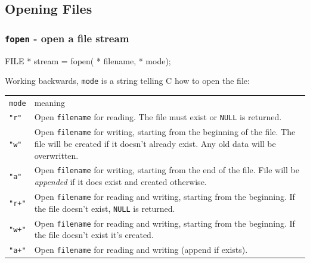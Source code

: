 \documentclass[smaller,handout,table]{beamer}
\begin{document}
\subsection{Opening Files}
\begin{frame}
\frametitle{{\tt fopen} - open a file stream}
\begin{semiverbatim}
\small
FILE * stream = fopen( * filename,  * mode);
\end{semiverbatim}

Working backwards, {\tt mode} is a string telling C how to open the file:
{\footnotesize
\begin{center}
\begin{tabular}{l p{250pt}}
\tt mode& meaning\\
\tt "r"& Open {\tt filename} for reading. The file must exist or {\tt NULL} is returned.\\
\tt "w"& Open {\tt filename} for writing, starting from the beginning of the file. The file will be created if it doesn't already exist. Any old data will be overwritten.\\
\tt "a"& Open {\tt filename} for writing, starting from the end of the file. File will be \emph{appended} if it does exist and created otherwise.\\
\tt "r+"& Open {\tt filename} for reading and writing, starting from the beginning. If the file doesn't exist, {\tt NULL} is returned.\\
\tt "w+"& Open {\tt filename} for reading and writing, starting from the beginning. If the file doesn't exist it's created.\\
\tt "a+"& Open {\tt filename} for reading and writing (append if exists).
\end{tabular}
\end{center}}
\end{frame}
\end{document}
